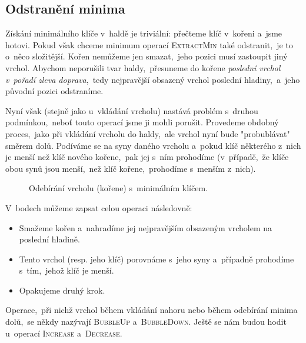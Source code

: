 \subsection{Odstranění minima}

Získání minimálního klíče v~haldě je triviální: přečteme klíč v~kořeni a~jsme hotovi. Pokud však chceme minimum operací \textsc{ExtractMin} také odstranit,~je to o~něco složitější. Kořen nemůžeme jen smazat,~jeho pozici musí zastoupit jiný vrchol. Abychom neporušili tvar haldy,~přesuneme do kořene \emph{poslední vrchol v~pořadí zleva doprava},~tedy nejpravější obsazený vrchol poslední hladiny,~a~jeho původní pozici odstraníme.

Nyní však (stejně jako u~vkládání vrcholu) nastává problém s~druhou podmínkou,~neboť touto operací jsme ji mohli porušit. Provedeme obdobný proces,~jako při vkládání vrcholu do haldy,~ale vrchol nyní bude "probublávat" směrem dolů. Podíváme se na syny daného vrcholu a~pokud klíč některého z~nich je menší než klíč nového kořene,~pak jej s~ním prohodíme (v~případě,~že klíče obou synů jsou menší,~než klíč kořene,~prohodíme s~menším z~nich).
\begin{figure}[ht]
    \centering
    \begin{subfigure}{5cm}
        
    \end{subfigure}
    \begin{subfigure}{5cm}
        
    \end{subfigure}
    \begin{subfigure}{5cm}
        
    \end{subfigure}
    \begin{subfigure}{5cm}
        
    \end{subfigure}
    \begin{subfigure}{5cm}
        
    \end{subfigure}
    \caption{Odebírání vrcholu (kořene) s~minimálním klíčem.}
    \label{fig:odebirani_vrcholu_halda}
\end{figure}
V~bodech můžeme zapsat celou operaci následovně:
\begin{itemize}
    \item Smažeme kořen a~nahradíme jej nejpravějším obsazeným vrcholem na poslední hladině.
    \item Tento vrchol (resp. jeho klíč) porovnáme s~jeho syny a~případně prohodíme s~tím,~jehož klíč je menší.
    \item Opakujeme druhý krok.
\end{itemize}
Operace,~při nichž vrchol během vkládání  nahoru nebo během odebírání minima dolů,~se někdy nazývají \textsc{BubbleUp} a~\textsc{BubbleDown}. Ještě se nám budou hodit u~operací \textsc{Increase} a~\textsc{Decrease}.

